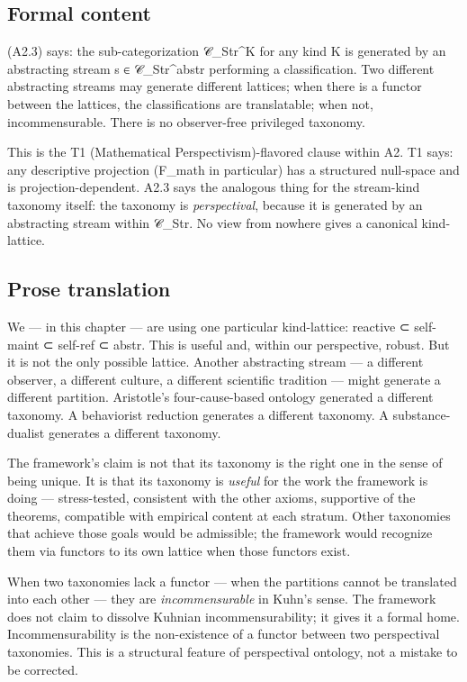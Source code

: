 \documentclass[11pt, openany]{book}
\begin{document}
\subsection{Formal content}

(A2.3) says: the sub-categorization 𝒞\_\allowbreak{}Str\textasciicircum{}K for any kind K is generated by an abstracting stream s ∈ 𝒞\_\allowbreak{}Str\textasciicircum{}abstr performing a classification. Two different abstracting streams may generate different lattices; when there is a functor between the lattices, the classifications are translatable; when not, incommensurable. There is no observer-free privileged taxonomy.

This is the T1 (Mathematical Perspectivism)-flavored clause within A2. T1 says: any descriptive projection (F\_\allowbreak{}math in particular) has a structured null-space and is projection-dependent. A2.3 says the analogous thing for the stream-kind taxonomy itself: the taxonomy is \textit{perspectival}, because it is generated by an abstracting stream within 𝒞\_\allowbreak{}Str. No view from nowhere gives a canonical kind-lattice.

\subsection{Prose translation}

We --- in this chapter --- are using one particular kind-lattice: reactive ⊂ self-maint ⊂ self-ref ⊂ abstr. This is useful and, within our perspective, robust. But it is not the only possible lattice. Another abstracting stream --- a different observer, a different culture, a different scientific tradition --- might generate a different partition. Aristotle's four-cause-based ontology generated a different taxonomy. A behaviorist reduction generates a different taxonomy. A substance-dualist generates a different taxonomy.

The framework's claim is not that its taxonomy is the right one in the sense of being unique. It is that its taxonomy is \textit{useful} for the work the framework is doing --- stress-tested, consistent with the other axioms, supportive of the theorems, compatible with empirical content at each stratum. Other taxonomies that achieve those goals would be admissible; the framework would recognize them via functors to its own lattice when those functors exist.

When two taxonomies lack a functor --- when the partitions cannot be translated into each other --- they are \textit{incommensurable} in Kuhn's sense. The framework does not claim to dissolve Kuhnian incommensurability; it gives it a formal home. Incommensurability is the non-existence of a functor between two perspectival taxonomies. This is a structural feature of perspectival ontology, not a mistake to be corrected.
\end{document}
